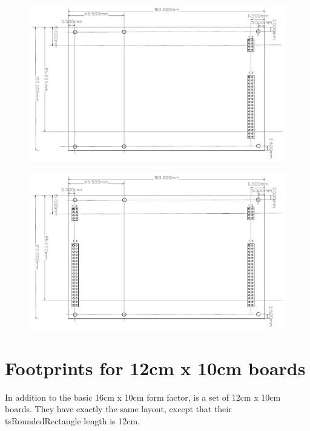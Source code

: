 \begin{figure}[ht]
    \centering
    \includegraphics[page=1, width=\textwidth]{./Figures/LCS-FP-EXT-R-40-10X16.pdf}
\end{figure}

\FloatBarrier

\begin{figure}[ht]
    \centering
    \includegraphics[page=1, width=\textwidth]{./figures/LCS-FP-EXT-L-R-40-10X16.pdf}
\end{figure}

\FloatBarrier

\section{Footprints for 12cm x 10cm boards}

In addition to the basic 16cm x 10cm form factor, is a set of 12cm x 10cm boards. They have exactly the same layout, except that their tsRoundedRectangle length is 12cm. 

